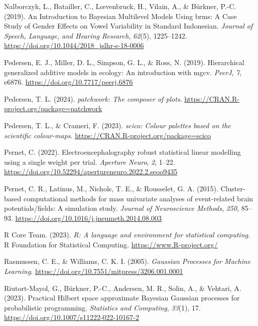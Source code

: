 \documentclass[
  doc,
  floatsintext,
  longtable,
  a4paper,
  nolmodern,
  notxfonts,
  notimes,
  colorlinks=true,linkcolor=blue,citecolor=blue,urlcolor=blue]{apa7}
\newlength{\cslhangindent}
\newenvironment{CSLReferences}[2] %
 {\begin{list}{}{%
  \setlength{\itemindent}{0pt}
  \setlength{\leftmargin}{0pt}
  \setlength{\parsep}{0pt}
  \ifodd #1
   \setlength{\leftmargin}{\cslhangindent}
   \setlength{\itemindent}{-1\cslhangindent}
  \fi
  \setlength{\itemsep}{#2\baselineskip}}}
 {\end{list}}
\begin{document}
\begin{CSLReferences}{1}{0}
Nalborczyk, L., Batailler, C., Lœvenbruck, H., Vilain, A., \& Bürkner,
P.-C. (2019). An Introduction to Bayesian Multilevel Models Using brms:
A Case Study of Gender Effects on Vowel Variability in Standard
Indonesian. \emph{Journal of Speech, Language, and Hearing Research},
\emph{62}(5), 1225--1242.
\url{https://doi.org/10.1044/2018_jslhr-s-18-0006}

Pedersen, E. J., Miller, D. L., Simpson, G. L., \& Ross, N. (2019).
Hierarchical generalized additive models in ecology: An introduction
with mgcv. \emph{PeerJ}, \emph{7}, e6876.
\url{https://doi.org/10.7717/peerj.6876}

Pedersen, T. L. (2024). \emph{{patchwork}: The composer of plots}.
\url{https://CRAN.R-project.org/package=patchwork}

Pedersen, T. L., \& Crameri, F. (2023). \emph{{scico}: Colour palettes
based on the scientific colour-maps}.
\url{https://CRAN.R-project.org/package=scico}

Pernet, C. (2022). Electroencephalography robust statistical linear
modelling using a single weight per trial. \emph{Aperture Neuro},
\emph{2}, 1--22.
\url{https://doi.org/10.52294/apertureneuro.2022.2.seoo9435}

Pernet, C. R., Latinus, M., Nichols, T. E., \& Rousselet, G. A. (2015).
Cluster-based computational methods for mass univariate analyses of
event-related brain potentials/fields: A simulation study. \emph{Journal
of Neuroscience Methods}, \emph{250}, 85--93.
\url{https://doi.org/10.1016/j.jneumeth.2014.08.003}

R Core Team. (2023). \emph{{R}: A language and environment for
statistical computing}. R Foundation for Statistical Computing.
\url{https://www.R-project.org/}

Rasmussen, C. E., \& Williams, C. K. I. (2005). \emph{Gaussian Processes
for Machine Learning}.
\url{https://doi.org/10.7551/mitpress/3206.001.0001}

Riutort-Mayol, G., Bürkner, P.-C., Andersen, M. R., Solin, A., \&
Vehtari, A. (2023). Practical {Hilbert} space approximate {Bayesian
Gaussian} processes for probabilistic programming. \emph{Statistics and
Computing}, \emph{33}(1), 17.
\url{https://doi.org/10.1007/s11222-022-10167-2}


\end{CSLReferences}
\end{document}
